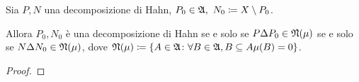 \documentclass[../EserciziIstituzioniAnalisi.tex]{subfiles}
\begin{document}
\begin{exercise}
  Sia $P,N$ una decomposizione di Hahn, $P_0\in\gA,\ N_0\coloneqq X\setminus P_0$.

  Allora $P_0,N_0$ è una decomposizione di Hahn se e solo se $P\Delta P_0\in\mathfrak N(\mu)$ se e solo se $N\Delta N_0\in\mathfrak N(\mu)$, dove $\mathfrak N(\mu)\coloneqq\{A\in\mathfrak A\colon \forall B\in \mathfrak A, B\subseteq A \mu(B)=0\}$.
\end{exercise}
\begin{proof}
  
\end{proof}
\end{document}
